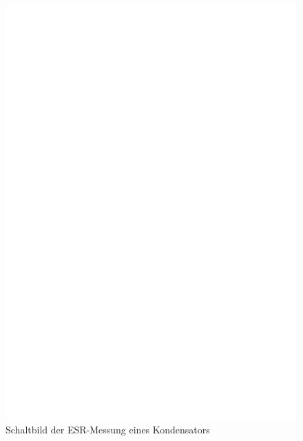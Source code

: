\begin{figure}[H]
  \centering
    \includegraphics[]{../FIG/Cap_esr.eps}
  \caption{Schaltbild der ESR-Messung eines Kondensators}
  \label{fig:Cap_esr}
\end{figure}

